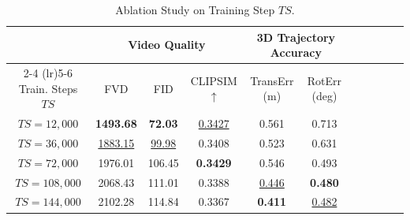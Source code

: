 \begin{table}[!ht]

\caption{Ablation Study on Training Step $TS$.}
\label{tab:ablation_ts}

\centering
\begin{threeparttable}
\resizebox{.85\textwidth}{!} 
{
\begin{tabular}{ccccccccccc}
\toprule
&  \multicolumn{3}{c}{ Video Quality } & \multicolumn{2}{c}{ 3D Trajectory Accuracy } \\
\cmidrule(lr){2-4} 
\cmidrule(lr){5-6} 
Train. Steps $TS$ & FVD  & FID  & CLIPSIM $\uparrow$ & TransErr (m)  & RotErr (deg)  \\

\midrule
$TS=12,000$ & \textbf{1493.68} & \textbf{72.03} & \underline{0.3427} & 0.561 & 0.713 \\
$TS=36,000$ & \underline{1883.15} & \underline{99.98} & 0.3408 & 0.523 & 0.631 \\
$TS=72,000$ & 1976.01 & 106.45 & \textbf{0.3429} & 0.546 & 0.493 \\
$TS=108,000$ & 2068.43 & 111.01 & 0.3388 & \underline{0.446} & \textbf{0.480} \\
$TS=144,000$ & 2102.28 & 114.84 & 0.3367 & \textbf{0.411} & \underline{0.482} \\
\bottomrule

\end{tabular}
}

\end{threeparttable}
\end{table}
